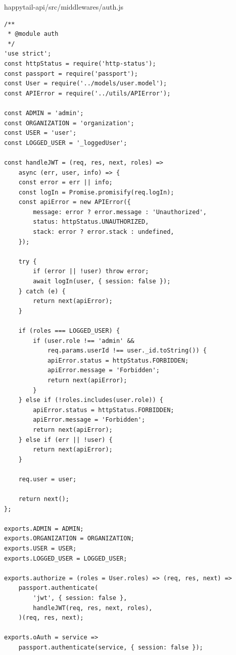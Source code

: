 \documentclass[12pt]{article}
\begin{document}
  \normalsize
 happytail-api/src/middlewares/auth.js
 \footnotesize
\begin{verbatim}
/**
 * @module auth
 */
'use strict';
const httpStatus = require('http-status');
const passport = require('passport');
const User = require('../models/user.model');
const APIError = require('../utils/APIError');

const ADMIN = 'admin';
const ORGANIZATION = 'organization';
const USER = 'user';
const LOGGED_USER = '_loggedUser';

const handleJWT = (req, res, next, roles) => 
	async (err, user, info) => {
    const error = err || info;
    const logIn = Promise.promisify(req.logIn);
    const apiError = new APIError({
        message: error ? error.message : 'Unauthorized',
        status: httpStatus.UNAUTHORIZED,
        stack: error ? error.stack : undefined,
    });

    try {
        if (error || !user) throw error;
        await logIn(user, { session: false });
    } catch (e) {
        return next(apiError);
    }

    if (roles === LOGGED_USER) {
        if (user.role !== 'admin' && 
        	req.params.userId !== user._id.toString()) {
            apiError.status = httpStatus.FORBIDDEN;
            apiError.message = 'Forbidden';
            return next(apiError);
        }
    } else if (!roles.includes(user.role)) {
        apiError.status = httpStatus.FORBIDDEN;
        apiError.message = 'Forbidden';
        return next(apiError);
    } else if (err || !user) {
        return next(apiError);
    }

    req.user = user;

    return next();
};

exports.ADMIN = ADMIN;
exports.ORGANIZATION = ORGANIZATION;
exports.USER = USER;
exports.LOGGED_USER = LOGGED_USER;

exports.authorize = (roles = User.roles) => (req, res, next) =>
    passport.authenticate(
        'jwt', { session: false },
        handleJWT(req, res, next, roles),
    )(req, res, next);

exports.oAuth = service =>
    passport.authenticate(service, { session: false });

 \end{verbatim}
 
\end{document}
